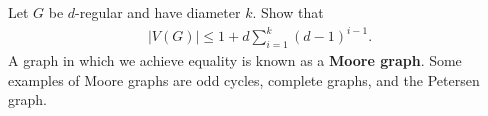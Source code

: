 \begin{enumerate}
    Let $G$ be $d$-regular and have diameter $k$. Show that
    \begin{align*}
        |V(G)| \leq 1 + d \sum_{i=1}^{k} (d-1)^{i-1}.
    \end{align*}
    A graph in which we achieve equality is known as a \textbf{Moore graph}. Some examples of Moore graphs are odd cycles, complete graphs, and the Petersen graph.
\end{enumerate}